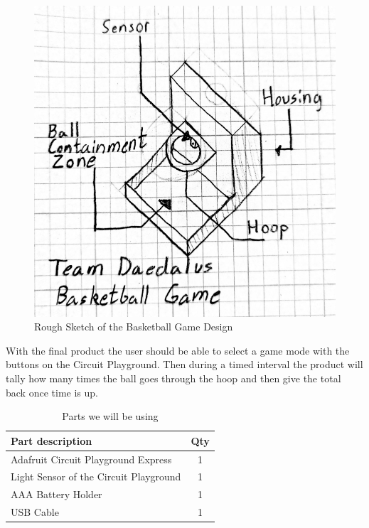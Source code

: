 \documentclass[12pt]{article}
\begin{document}
\begin{figure}[!t]
\centering
\includegraphics[width=4.5in]{TeamDaedalusBasketballGame.png}
\caption{Rough Sketch of the Basketball Game Design}
\label{fig:cpx}
\end{figure}

With the final product the user should be able to select a game mode with the buttons on the Circuit Playground. Then during a timed interval the product will tally how many times the ball goes through the hoop and then give the total back once time is up.

\begin{table}[ht]
  \caption{Parts we will be using}
  \label{table:parts_list}
  \begin{center}
  \begin{tabular}{|p{3in}|c|}
  
  \hline
  Part description & Qty\\
  \hline
  \hline
  Adafruit Circuit Playground Express & 1 \\
  \hline
  Light Sensor of the Circuit Playground & 1 \\
  \hline
  AAA Battery Holder & 1 \\
  \hline
  USB Cable & 1 \\
  \hline
  \end{tabular}
  \end{center}
  \end{table}
\end{document}
